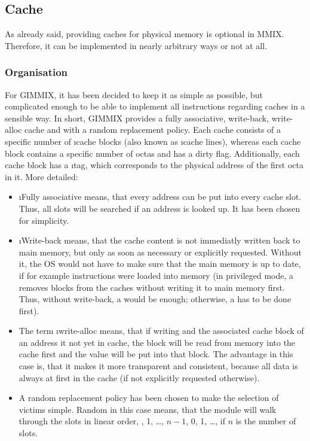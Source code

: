 \subsection{Cache}

As already said, providing caches for physical memory is optional in MMIX. Therefore, it can be implemented in nearly arbitrary ways or not at all.

\subsubsection{Organisation}

For GIMMIX, it has been decided to keep it as simple as possible, but complicated enough to be able to implement all instructions regarding caches in a sensible way. In short, GIMMIX provides a fully associative, write-back, write-alloc cache and with a random replacement policy. Each cache consists of a specific number of \i{cache blocks} (also known as \i{cache lines}), whereas each cache block contains a specific number of octas and has a dirty flag. Additionally, each cache block has a \i{tag}, which corresponds to the physical address of the first octa in it. More detailed:
\begin{itemize}
	\item \i{Fully associative} means, that every address can be put into every cache slot. Thus, all slots will be searched if an address is looked up. It has been chosen for simplicity.
	\item \i{Write-back} means, that the cache content is not immediatly written back to main memory, but only as soon as necessary or explicitly requested. Without it, the OS would not have to make sure that the main memory is up to date, if for example instructions were loaded into memory (in privileged mode, a  removes blocks from the caches without writing it to main memory first. Thus, without write-back, a  would be enough; otherwise, a  has to be done first).
	\item The term \i{write-alloc} means, that if writing and the associated cache block of an address it not yet in cache, the block will be read from memory into the cache first and the value will be put into that block. The advantage in this case is, that it makes it more transparent and consistent, because all data is always at first in the cache (if not explicitly requested otherwise).
	\item A random replacement policy has been chosen to make the selection of victims simple. Random in this case means, that the module will walk through the slots in linear order, , 1, \dots, $n-1$, 0, 1, \dots, if $n$ is the number of slots.
\end{itemize}


